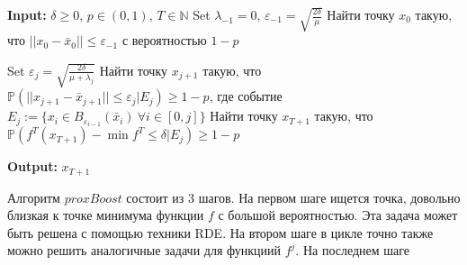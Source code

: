 \documentclass{article}
\newcommand{\e}{\varepsilon}
\begin{document}
\begin{algorithm}
            \caption{$proxBoost(\delta, p, T)$} \label{algorithm: cds bw}
            \textbf{Input:}
            $\delta \ge 0$, $p \in (0, 1)$, $T \in \mathbb{N}$
            \State Set $\lambda_{-1} = 0$, $\e_{-1} = \sqrt{\frac{2\delta}{\mu}}$
            \State Найти точку $x_0$ такую, что $||x_0 - \bar{x}_0|| \le \e_{-1}$ с вероятностью $1 - p$
            \hspace*{\algorithmicindent} 
            \begin{algorithmic}
                    \State Set $\e_{j} = \sqrt{\frac{2\delta}{\mu + \lambda_j}}$
                    \State Найти точку $x_{j + 1}$ такую, что $\mathds{P}(||x_{j + 1} - \bar{x}_{j + 1}|| \le \e_{j}|E_j) \ge 1 - p$, где событие $E_j := \{x_i \in B_{\e_{i - 1}}(\bar{x}_i) \ \forall i \in [0, j]\}$
                    \EndFor   
                    \State Найти точку $x_{T + 1}$ такую, что $\mathds{P}(f^T(x_{T+1}) - \min f^T \le \delta |E_j) \ge 1 - p$   
            \end{algorithmic}
            \State \textbf{Output:} 
            $x_{T + 1}$
    \end{algorithm}
Алгоритм $proxBoost$ состоит из 3 шагов. На первом шаге ищется точка, довольно близкая к точке минимума функции $f$ с большой вероятностью. Эта задача может быть решена с помощью техники RDE. На втором шаге в цикле точно также можно решить аналогичные задачи для функциий $f^j$. На последнем шаге


\end{document}
